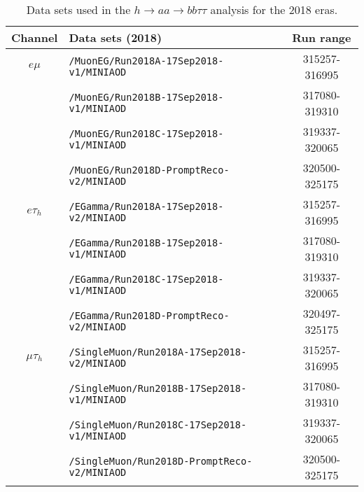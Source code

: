    \begin{table}[ht]
    \begin{center}
    {\scriptsize
    \begin{tabular}{|c|l|c|}
    \hline
    Channel & Data sets (2018) & Run range\\
    \hline
    $e\mu$ & \texttt{/MuonEG/Run2018A-17Sep2018-v1/MINIAOD} & 315257-316995\\
    & \texttt{/MuonEG/Run2018B-17Sep2018-v1/MINIAOD} & 317080-319310\\
    & \texttt{/MuonEG/Run2018C-17Sep2018-v1/MINIAOD} & 319337-320065\\
    & \texttt{/MuonEG/Run2018D-PromptReco-v2/MINIAOD} & 320500-325175\\
    \hline
    $e\tau_{h}$ & \texttt{/EGamma/Run2018A-17Sep2018-v2/MINIAOD} & 315257-316995\\
    & \texttt{/EGamma/Run2018B-17Sep2018-v1/MINIAOD} & 317080-319310\\
    & \texttt{/EGamma/Run2018C-17Sep2018-v1/MINIAOD} & 319337-320065\\
    & \texttt{/EGamma/Run2018D-PromptReco-v2/MINIAOD} & 320497-325175\\
    \hline
    $\mu\tau_{h}$ & \texttt{/SingleMuon/Run2018A-17Sep2018-v2/MINIAOD} & 315257-316995\\
    & \texttt{/SingleMuon/Run2018B-17Sep2018-v1/MINIAOD} & 317080-319310\\
    & \texttt{/SingleMuon/Run2018C-17Sep2018-v1/MINIAOD} & 319337-320065\\
    & \texttt{/SingleMuon/Run2018D-PromptReco-v2/MINIAOD} & 320500-325175\\
    \hline
    \end{tabular}
    }
    \end{center}
    \caption{Data sets used in the $h\rightarrow aa \rightarrow bb\tau\tau$ analysis for the 2018 eras.}
    \label{tab:2018datasets}
\end{table}
    
